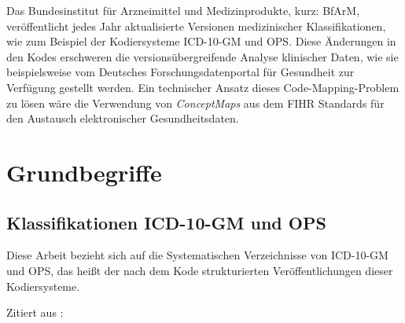 \begin{comment}
\bibitem{medinf-init}
Medizininformatik-Initiative \newline
\url{https://www.medizininformatik-initiative.de/de/start}

\bibitem{fdpg}
Deutsches Forschungsdatenportal für Gesundheit \newline
\url{https://forschen-fuer-gesundheit.de}
\end{comment}

Das Bundesinstitut für Arzneimittel und Medizinprodukte, kurz: BfArM, veröffentlicht jedes Jahr aktualisierte Versionen medizinischer Klassifikationen, wie zum Beispiel der Kodiersysteme ICD-10-GM und OPS. Diese Änderungen in den Kodes erschweren die versionsübergreifende Analyse klinischer Daten, wie sie beispielsweise vom Deutsches Forschungsdatenportal für Gesundheit \cite{medinf-init} zur Verfügung gestellt werden. Ein technischer Ansatz dieses Code-Mapping-Problem zu lösen wäre die Verwendung von \emph{ConceptMaps} aus dem FIHR Standards für den Austausch elektronischer Gesundheitsdaten.

\section{Grundbegriffe}
\subsection{Klassifikationen ICD-10-GM und OPS}

Diese Arbeit bezieht sich auf die Systematischen Verzeichnisse von ICD-10-GM und OPS, das heißt der nach dem Kode strukturierten Veröffentlichungen dieser Kodiersysteme. 


Zitiert aus \cite[Seite 97]{gaus2005dokumentation}:


